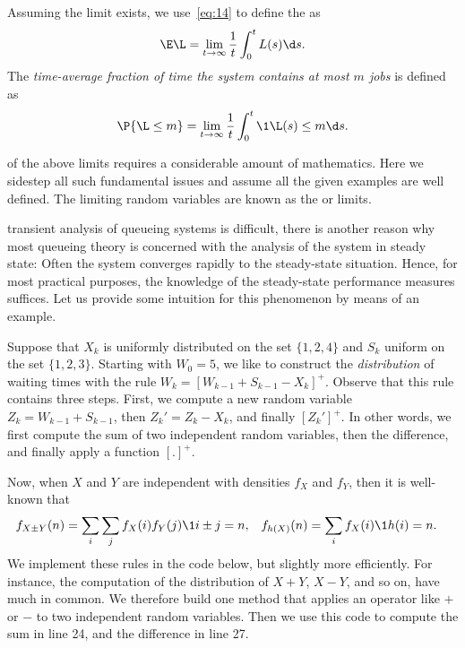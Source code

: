 Assuming the limit exists, we use~\cref{eq:14} to define the  as
\begin{equation} \label{eq:46}
 \E\L = \lim_{t\to\infty} \frac 1 t\int_0^t L(s) \d s.
\end{equation}
 The \emph{time-average fraction of time the system contains at most $m$ jobs} is defined as
\begin{equation*}
 \P{\L\leq m} =\lim_{t\to\infty} \frac 1 t\int_0^t \1{\L(s)\leq m} \d s.
\end{equation*}

 of the above limits requires a considerable amount of mathematics.
Here we sidestep all such fundamental issues and assume all the given examples are well defined.
The limiting random variables are known as the  or  limits.

 transient analysis of queueing systems is difficult, there is another reason why most queueing theory is concerned with the analysis of the system in steady state: Often the system converges rapidly to the steady-state situation.
Hence, for most practical purposes, the knowledge of the steady-state performance measures suffices.
Let us provide some intuition for this phenomenon by means of an example.


Suppose that $X_k$ is uniformly distributed on the set $\{1,2,4\}$ and $S_k$ uniform on the set $\{1,2,3\}$.
Starting with $W_{0}=5$, we like to construct the \emph{distribution} of waiting times with the rule $W_{k}=[W_{k-1}+S_{k-1}-X_k]^+$.
Observe that this rule contains three steps.
First, we compute a new random variable $Z_k = W_{k-1} + S_{k-1}$, then  $Z_k' = Z_k - X_k$, and finally $[Z_k']^+$. 
In other words, we first compute the sum of two independent random variables, then the difference, and finally apply a function $[.]^+$. 

Now, when $X$ and $Y$ are independent with densities $f_X$ and $f_Y$, then it is well-known that 
\begin{align*}
f_{X\pm Y}(n) &= \sum_i \sum_j f_X(i) f_Y(j)\1{i\pm j = n}, & f_{h(X)}(n) &= \sum_{i} f_X(i)\1{h(i)=n}.
\end{align*}
We implement these rules in the code below, but slightly more efficiently.
For instance, the computation of the distribution of $X+Y$, $X-Y$, and so on, have much in common.
We therefore build one method  that applies an operator like $+$ or $-$ to two independent random variables.
Then we use this code to compute the sum in line 24, and the difference in line 27. 


